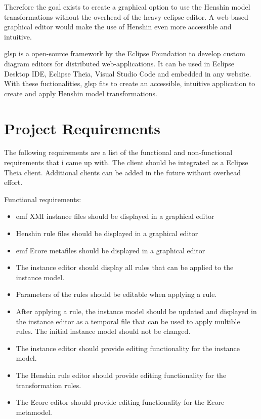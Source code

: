 \documentclass[conference,onecolumn]{IEEEtran}
\begin{document}
  Therefore the goal exists to create a graphical option to use the Henshin model transformations without the overhead of the heavy eclipse editor. A web-based graphical editor would make the use of Henshin even more accessible and intuitive.

  \ac{glsp} is a open-source framework by the Eclipse Foundation to develop custom diagram editors for distributed web-applications. \cite{glsp-repo} It can be used in Eclipse Desktop IDE, Eclipse Theia, Visual Studio Code and embedded in any website. With these fuctionalities, \ac{glsp} fits to create an accessible, intuitive application to create and apply Henshin model transformations.

  \section{Project Requirements}
  \label{subsec:requirements}

  The following requirements are a list of the functional and non-functional requirements that i came up with. The client should be integrated as a Eclipse Theia client. Additional clients can be added in the future without overhead effort.

  Functional requirements:

  \begin{itemize}
  
    \item \ac{emf} XMI instance files should be displayed in a graphical editor
    \item Henshin rule files should be displayed in a graphical editor
    \item \ac{emf} Ecore metafiles should be displayed in a graphical editor
    \item The instance editor should display all rules that can be applied to the instance model.
    \item Parameters of the rules should be editable when applying a rule.
    \item After applying a rule, the instance model should be updated and displayed in the instance editor as a temporal file that can be used to apply multible rules. The initial instance model should not be changed.
    \item The instance editor should provide editing functionality for the instance model.
    \item The Henshin rule editor should provide editing functionality for the transformation rules.
    \item The Ecore editor should provide editing functionality for the Ecore metamodel.

  \end{itemize}
\end{document}
